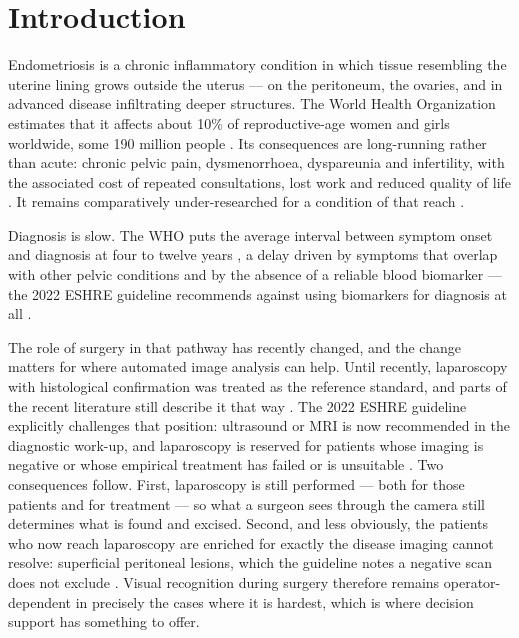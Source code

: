 \documentclass[preprint,12pt]{elsarticle}
\begin{document}
\section{Introduction}
\label{sec:intro}

Endometriosis is a chronic inflammatory condition in which tissue resembling the uterine lining grows outside the uterus --- on the peritoneum, the ovaries, and in advanced disease infiltrating deeper structures. The World Health Organization estimates that it affects about 10\% of reproductive-age women and girls worldwide, some 190 million people \cite{ref_who}. Its consequences are long-running rather than acute: chronic pelvic pain, dysmenorrhoea, dyspareunia and infertility, with the associated cost of repeated consultations, lost work and reduced quality of life \cite{ref_who,ref_e3}. It remains comparatively under-researched for a condition of that reach \cite{ref_e4}.

Diagnosis is slow. The WHO puts the average interval between symptom onset and diagnosis at four to twelve years \cite{ref_who}, a delay driven by symptoms that overlap with other pelvic conditions and by the absence of a reliable blood biomarker --- the 2022 ESHRE guideline recommends against using biomarkers for diagnosis at all \cite{ref_eshre}.

The role of surgery in that pathway has recently changed, and the change matters for where automated image analysis can help. Until recently, laparoscopy with histological confirmation was treated as the reference standard, and parts of the recent literature still describe it that way \cite{ref_e3}. The 2022 ESHRE guideline explicitly challenges that position: ultrasound or MRI is now recommended in the diagnostic work-up, and laparoscopy is reserved for patients whose imaging is negative or whose empirical treatment has failed or is unsuitable \cite{ref_eshre}. Two consequences follow. First, laparoscopy is still performed --- both for those patients and for treatment --- so what a surgeon sees through the camera still determines what is found and excised. Second, and less obviously, the patients who now reach laparoscopy are enriched for exactly the disease imaging cannot resolve: superficial peritoneal lesions, which the guideline notes a negative scan does not exclude \cite{ref_eshre}. Visual recognition during surgery therefore remains operator-dependent in precisely the cases where it is hardest, which is where decision support has something to offer.
\end{document}
